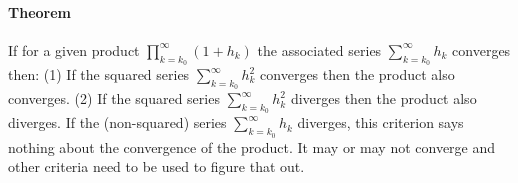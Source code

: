 \paragraph{Theorem} If for a given product $\prod_{k=k_0}^{\infty} (1 + h_k)$ the associated series  $\sum_{k=k_0}^{\infty} h_k$ converges then: (1) If the squared series $\sum_{k=k_0}^{\infty} h_k^2$ converges then the product also converges.  (2) If the squared series $\sum_{k=k_0}^{\infty} h_k^2$ diverges then the product also diverges. If the (non-squared) series $\sum_{k=k_0}^{\infty} h_k$ diverges, this criterion says nothing about the convergence of the product. It may or may not converge and other criteria need to be used to figure that out.













